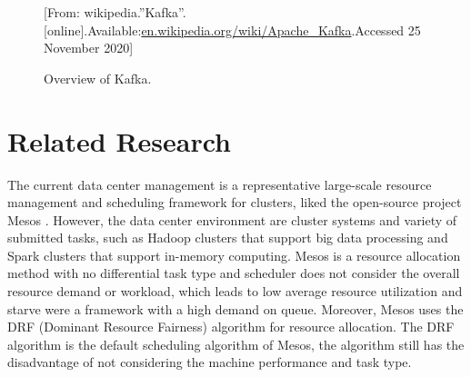 \documentclass[12pt,oneside,openright,a4paper]{cpe-english-project}
\begin{document}
\begin{figure}[!h]\centering
  \setlength{\fboxrule}{0mm} %
  \setlength{\fboxsep}{0cm}
  \caption{Overview of Kafka.}\label{fig:kafka}
  [From: wikipedia.''Kafka''.[online].Available:\url{en.wikipedia.org/wiki/Apache_Kafka}.Accessed 25 November 2020]
\end{figure}

\section{Related Research}
\hspace{10mm}The current data center management is a representative large-scale resource management and scheduling framework for clusters, liked the open-source project Mesos \cite{mesosInAction}. However, the data center environment are cluster systems and variety of submitted tasks, such as Hadoop clusters that support big data processing and Spark clusters that support in-memory computing. Mesos is a resource allocation method with no differential task type and scheduler does not consider the overall resource demand or workload, which leads to low average resource utilization and starve were a framework with a high demand on queue. Moreover, Mesos uses the DRF (Dominant Resource Fairness) algorithm for resource allocation. The DRF algorithm is the default scheduling algorithm of Mesos, the algorithm still has the disadvantage of not considering the machine performance and task type.
\end{document}
